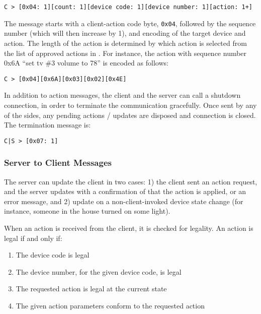 \begin{verbatim}
C > [0x04: 1][count: 1][device code: 1][device number: 1][action: 1+]
\end{verbatim}

\noindent
The message starts with a client-action code byte, {\tt 0x04}, followed by the sequence number (which will then increase by 1), and encoding of the target device and action. The length of the action is determined by which action is selected from the list of approved actions in . For instance, the action with sequence number 0x6A ``set tv \#3 volume to 78'' is encoded as follows:

\begin{verbatim}
C > [0x04][0x6A][0x03][0x02][0x4E]
\end{verbatim}

\noindent
In addition to action messages, the client and the server can call a shutdown connection, in order to terminate the communication gracefully. Once sent by any of the sides, any pending actions / updates are disposed and connection is closed. The termination message is:

\begin{verbatim}
C|S > [0x07: 1]
\end{verbatim}


\subsubsection{Server to Client Messages}
\label{sec:pdus:pdu:s_to_c}

The server can update the client in two cases: 1) the client sent an action request, and the server updates with a confirmation of that the action is applied, or an error message, and 2) update on a non-client-invoked device state change (for instance, someone in the house turned on some light).

When an action is received from the client, it is checked for legality. An action is legal if and only if:
\begin{enumerate}
\item The device code is legal
\item The device number, for the given device code, is legal
\item The requested action is legal at the current state
\item The given action parameters conform to the requested action
\end{enumerate}

